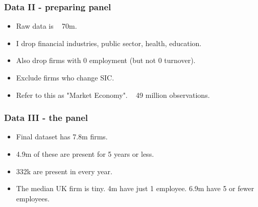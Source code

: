 \documentclass{beamer}
\begin{document}
\begin{frame}
\frametitle{Data II - preparing panel}

\begin{itemize}
    \item Raw data is ~ 70m.
    \item I drop financial industries, public sector, health, education.
    \item Also drop firms with 0 employment (but not 0 turnover).
    \item Exclude firms who change SIC.
    \item Refer to this as "Market Economy". ~ 49 million observations.
    
\end{itemize}

\end{frame}


\begin{frame}
\frametitle{Data III - the panel}

\begin{itemize}
    \item Final dataset has 7.8m firms.
    \item 4.9m of these are present for 5 years or less.
    \item 332k are present in every year. 
    \item The median UK firm is tiny. 4m have just 1 employee. 6.9m have 5 or fewer employees.
    
\end{itemize}

\end{frame}
\end{document}
